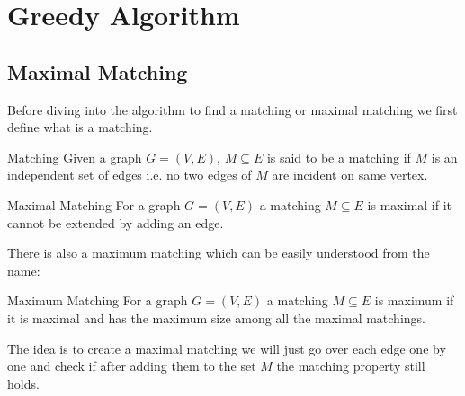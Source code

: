 \chapter{Greedy Algorithm}

\section{Maximal Matching}\label{greedy:max-matching}

\begin{algoprob}
\end{algoprob}
Before diving into the algorithm to find a matching or maximal matching we first define what is a matching.
\begin{Definition}{Matching}{}
	Given a graph $G=(V,E)$, $M\subseteq E$ is said to be a matching if $M$ is an independent set of edges i.e. no two edges of $M$ are incident on same vertex.
\end{Definition}
\begin{Definition}{Maximal Matching}{}
	For a graph $G=(V,E)$ a matching $M\subseteq E$ is maximal if it cannot be extended by adding an edge.
\end{Definition}
There is also a maximum matching which can be easily understood from the name:
\begin{Definition}{Maximum Matching}{}
	For a graph $G=(V,E)$ a matching $M\subseteq E$ is maximum if it is maximal and has the maximum size among all the maximal matchings.
\end{Definition}

\begin{idea*}
	The idea is to create a maximal matching we will just go over each edge one by one and check if after adding them to the set $M$  the matching property still holds. 
\end{idea*}
\begin{algorithm}
	\DontPrintSemicolon
\caption{}
\end{algorithm}

